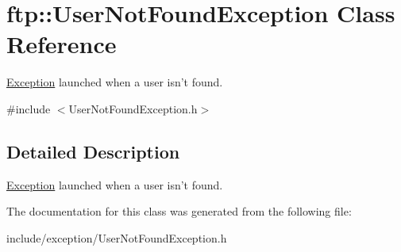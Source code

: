 \hypertarget{classftp_1_1_user_not_found_exception}{\section{ftp\-:\-:User\-Not\-Found\-Exception Class Reference}
\label{classftp_1_1_user_not_found_exception}
}


\hyperlink{classftp_1_1_exception}{Exception} launched when a user isn't found.  




{\ttfamily \#include $<$User\-Not\-Found\-Exception.\-h$>$}



\subsection{Detailed Description}
\hyperlink{classftp_1_1_exception}{Exception} launched when a user isn't found. 

The documentation for this class was generated from the following file\-:\begin{DoxyCompactItemize}
\item 
include/exception/User\-Not\-Found\-Exception.\-h\end{DoxyCompactItemize}
